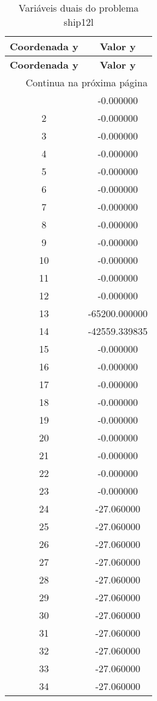 \documentclass[12pt]{article}
\begin{document}
\begin{longtable}{@{}cc@{}}
\caption{Variáveis duais do problema ship12l} \\
\toprule
\textbf{Coordenada y} & \textbf{Valor y} \\
\midrule
\endfirsthead

\toprule
\textbf{Coordenada y} & \textbf{Valor y} \\
\midrule
\endhead

\midrule \multicolumn{2}{r}{{Continua na próxima página}} \\ \midrule
\endfoot

\bottomrule
\endlastfoot
1 & -0.000000 \\
2 & -0.000000 \\
3 & -0.000000 \\
4 & -0.000000 \\
5 & -0.000000 \\
6 & -0.000000 \\
7 & -0.000000 \\
8 & -0.000000 \\
9 & -0.000000 \\
10 & -0.000000 \\
11 & -0.000000 \\
12 & -0.000000 \\
13 & -65200.000000 \\
14 & -42559.339835 \\
15 & -0.000000 \\
16 & -0.000000 \\
17 & -0.000000 \\
18 & -0.000000 \\
19 & -0.000000 \\
20 & -0.000000 \\
21 & -0.000000 \\
22 & -0.000000 \\
23 & -0.000000 \\
24 & -27.060000 \\
25 & -27.060000 \\
26 & -27.060000 \\
27 & -27.060000 \\
28 & -27.060000 \\
29 & -27.060000 \\
30 & -27.060000 \\
31 & -27.060000 \\
32 & -27.060000 \\
33 & -27.060000 \\
34 & -27.060000 \\

\end{longtable}
\end{document}
